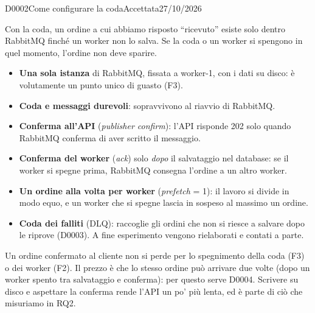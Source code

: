 \begin{decisione}{D0002}{Come configurare la coda}{Accettata}{27/10/2026}

\contesto
Con la coda, un ordine a cui abbiamo risposto ``ricevuto'' esiste solo dentro RabbitMQ finché un worker non lo salva. Se la coda o un worker si spengono in quel momento, l'ordine non deve sparire.

\scelta
\begin{itemize}
  \item \textbf{Una sola istanza} di RabbitMQ, fissata a worker-1, con i dati su disco: è volutamente un punto unico di guasto (F3).
  \item \textbf{Coda e messaggi durevoli}: sopravvivono al riavvio di RabbitMQ.
  \item \textbf{Conferma all'API} (\textit{publisher confirm}): l'API risponde 202 solo quando RabbitMQ conferma di aver scritto il messaggio.
  \item \textbf{Conferma del worker} (\textit{ack}) solo \emph{dopo} il salvataggio nel database: se il worker si spegne prima, RabbitMQ consegna l'ordine a un altro worker.
  \item \textbf{Un ordine alla volta per worker} (\textit{prefetch} = 1): il lavoro si divide in modo equo, e un worker che si spegne lascia in sospeso al massimo un ordine.
  \item \textbf{Coda dei falliti} (DLQ): raccoglie gli ordini che non si riesce a salvare dopo le riprove (D0003). A fine esperimento vengono rielaborati e contati a parte.
\end{itemize}

\conseguenze
Un ordine confermato al cliente non si perde per lo spegnimento della coda (F3) o dei worker (F2). Il prezzo è che lo stesso ordine può arrivare due volte (dopo un worker spento tra salvataggio e conferma): per questo serve D0004. Scrivere su disco e aspettare la conferma rende l'API un po' più lenta, ed è parte di ciò che misuriamo in RQ2.

\end{decisione}
